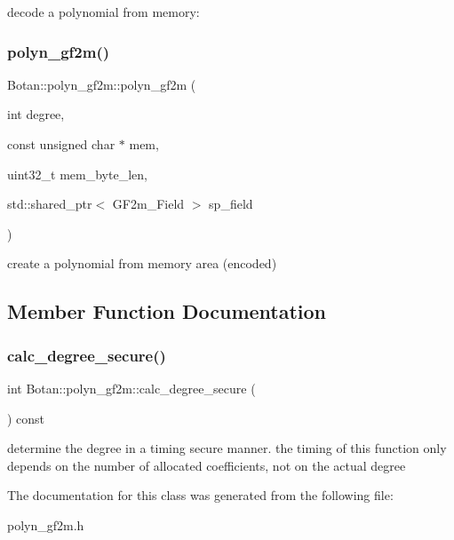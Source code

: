 decode a polynomial from memory\+: \mbox{\label{class_botan_1_1polyn__gf2m_a87baa4743b62dc4cbb4c1d73e4578d8c}} 
\subsubsection{\texorpdfstring{polyn\+\_\+gf2m()}{polyn\_gf2m()}\hspace{0.1cm}{\footnotesize\ttfamily [5/5]}}
{\footnotesize\ttfamily Botan\+::polyn\+\_\+gf2m\+::polyn\+\_\+gf2m (\begin{DoxyParamCaption}\item[{int}]{degree,  }\item[{const unsigned char $\ast$}]{mem,  }\item[{uint32\+\_\+t}]{mem\+\_\+byte\+\_\+len,  }\item[{std\+::shared\+\_\+ptr$<$ G\+F2m\+\_\+\+Field $>$}]{sp\+\_\+field }\end{DoxyParamCaption})}

create a polynomial from memory area (encoded) 

\subsection{Member Function Documentation}
\mbox{\label{class_botan_1_1polyn__gf2m_ac2b94d1eddf27838f4fcf03db4f8ac08}} 
\subsubsection{\texorpdfstring{calc\+\_\+degree\+\_\+secure()}{calc\_degree\_secure()}}
{\footnotesize\ttfamily int Botan\+::polyn\+\_\+gf2m\+::calc\+\_\+degree\+\_\+secure (\begin{DoxyParamCaption}{ }\end{DoxyParamCaption}) const}

determine the degree in a timing secure manner. the timing of this function only depends on the number of allocated coefficients, not on the actual degree 

The documentation for this class was generated from the following file\+:\begin{DoxyCompactItemize}
\item 
polyn\+\_\+gf2m.\+h\end{DoxyCompactItemize}
